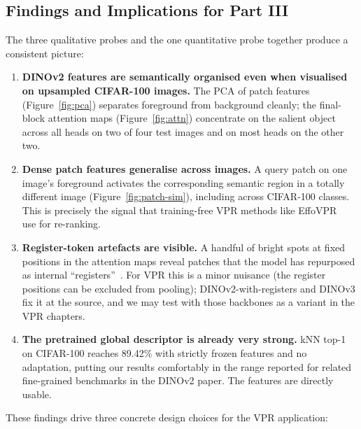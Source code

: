 \documentclass[11pt,a4paper]{article}
\begin{document}
\subsection{Findings and Implications for Part III}
\label{sec:findings}

The three qualitative probes and the one quantitative probe together
produce a consistent picture:

\begin{enumerate}[leftmargin=*]
  \item \textbf{DINOv2 features are semantically organised even when visualised
  on upsampled CIFAR-100 images.} The PCA of patch features (Figure~\ref{fig:pca})
  separates foreground from background cleanly; the final-block attention
  maps (Figure~\ref{fig:attn}) concentrate on the salient object across all
  heads on two of four test images and on most heads on the other two.
  \item \textbf{Dense patch features generalise across images.} A query patch
  on one image's foreground activates the corresponding semantic region in
  a totally different image (Figure~\ref{fig:patch-sim}), including across
  CIFAR-100 classes. This is precisely the signal that training-free VPR
  methods like EffoVPR~\citep{tzachor2024effovpr} use for re-ranking.
  \item \textbf{Register-token artefacts are visible.} A handful of bright
  spots at fixed positions in the attention maps reveal patches that the
  model has repurposed as internal ``registers''~\citep{darcet2024vision}.
  For VPR this is a minor nuisance (the register positions can be excluded
  from pooling); DINOv2-with-registers and DINOv3 fix it at the source,
  and we may test with those backbones as a variant in the VPR chapters.
  \item \textbf{The pretrained global descriptor is already very
  strong.} kNN top-1 on CIFAR-100 reaches 89.42\% with strictly frozen
  features and no adaptation, putting our results comfortably in the
  range reported for related fine-grained benchmarks in the DINOv2
  paper. The features are directly usable.
\end{enumerate}

These findings drive three concrete design choices for the VPR application:
\end{document}
